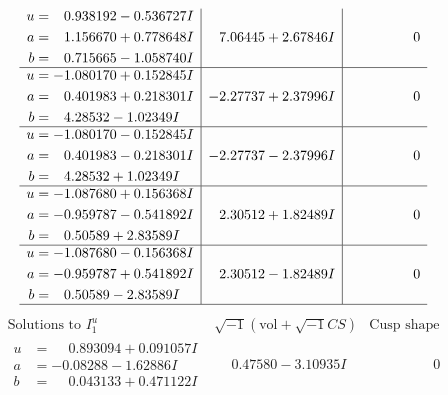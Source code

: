 \documentclass[1p]{elsarticle_modified}
\theoremstyle{definition}
\newcommand{\I}{\sqrt{-1}}
\begin{document}
$$\begin{array}{c|c|c}
\begin{aligned}
u &= \phantom{-}0.938192 - 0.536727 I \\
a &= \phantom{-}1.156670 + 0.778648 I \\
b &= \phantom{-}0.715665 - 1.058740 I\end{aligned}
 & \phantom{-}7.06445 + 2.67846 I & \phantom{-0.000000 } 0 \\ \hline\begin{aligned}
u &= -1.080170 + 0.152845 I \\
a &= \phantom{-}0.401983 + 0.218301 I \\
b &= \phantom{-}4.28532 - 1.02349 I\end{aligned}
 & -2.27737 + 2.37996 I & \phantom{-0.000000 } 0 \\ \hline\begin{aligned}
u &= -1.080170 - 0.152845 I \\
a &= \phantom{-}0.401983 - 0.218301 I \\
b &= \phantom{-}4.28532 + 1.02349 I\end{aligned}
 & -2.27737 - 2.37996 I & \phantom{-0.000000 } 0 \\ \hline\begin{aligned}
u &= -1.087680 + 0.156368 I \\
a &= -0.959787 - 0.541892 I \\
b &= \phantom{-}0.50589 + 2.83589 I\end{aligned}
 & \phantom{-}2.30512 + 1.82489 I & \phantom{-0.000000 } 0 \\ \hline\begin{aligned}
u &= -1.087680 - 0.156368 I \\
a &= -0.959787 + 0.541892 I \\
b &= \phantom{-}0.50589 - 2.83589 I\end{aligned}
 & \phantom{-}2.30512 - 1.82489 I & \phantom{-0.000000 } 0\\
 \hline 
 \end{array}$$\newpage$$\begin{array}{c|c|c}  
\text{Solutions to }I^u_{1}& \I (\text{vol} + \sqrt{-1}CS) & \text{Cusp shape}\\
 \hline 
\begin{aligned}
u &= \phantom{-}0.893094 + 0.091057 I \\
a &= -0.08288 - 1.62886 I \\
b &= \phantom{-}0.043133 + 0.471122 I\end{aligned}
 & \phantom{-}0.47580 - 3.10935 I & \phantom{-0.000000 } 0 \\ \hline\begin{aligned}

\end{aligned}
\end{array}$$
\end{document}
